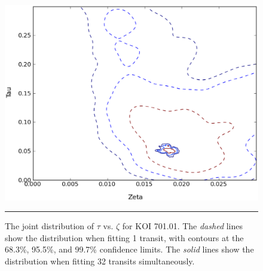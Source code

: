 
\begin{figure}[t] 
  \begin{minipage}[c]{0.47\textwidth}
    \includegraphics[width=\textwidth]{figures/joint.eps}
  \end{minipage}\hfill
  \begin{minipage}[c]{0.5\textwidth}
    \caption{The joint distribution of $\tau$ vs. $\zeta$ for KOI
      701.01.  The {\it dashed} lines show the distribution when
      fitting 1 transit, with contours at the 68.3\%, 95.5\%, and
      99.7\% confidence limits.  The {\it solid} lines show the
      distribution when fitting 32 transits simultaneously.}
    \label{fig-joint}
    \hspace*{\fill}  
    \hrule
  \end{minipage}
\end{figure}


